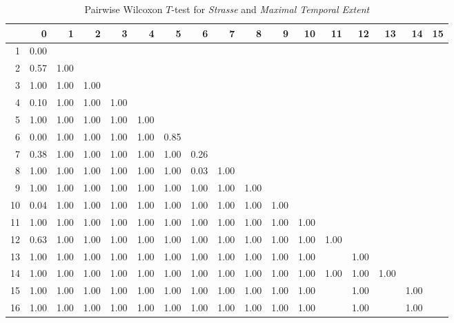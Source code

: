 \begin{table}[ht!]
	\tiny
	\setlength{\tabcolsep}{4pt}
	\centering
  \begin{tabular}{rrrrrrrrrrrrrrrrr}
    \hline
   & 0 & 1 & 2 & 3 & 4 & 5 & 6 & 7 & 8 & 9 & 10 & 11 & 12 & 13 & 14 & 15 \\ 
    \hline
  1 & 0.00 &  &  &  &  &  &  &  &  &  &  &  &  &  &  &  \\ 
    2 & 0.57 & 1.00 &  &  &  &  &  &  &  &  &  &  &  &  &  &  \\ 
    3 & 1.00 & 1.00 & 1.00 &  &  &  &  &  &  &  &  &  &  &  &  &  \\ 
    4 & 0.10 & 1.00 & 1.00 & 1.00 &  &  &  &  &  &  &  &  &  &  &  &  \\ 
    5 & 1.00 & 1.00 & 1.00 & 1.00 & 1.00 &  &  &  &  &  &  &  &  &  &  &  \\ 
    6 & 0.00 & 1.00 & 1.00 & 1.00 & 1.00 & 0.85 &  &  &  &  &  &  &  &  &  &  \\ 
    7 & 0.38 & 1.00 & 1.00 & 1.00 & 1.00 & 1.00 & 0.26 &  &  &  &  &  &  &  &  &  \\ 
    8 & 1.00 & 1.00 & 1.00 & 1.00 & 1.00 & 1.00 & 0.03 & 1.00 &  &  &  &  &  &  &  &  \\ 
    9 & 1.00 & 1.00 & 1.00 & 1.00 & 1.00 & 1.00 & 1.00 & 1.00 & 1.00 &  &  &  &  &  &  &  \\ 
    10 & 0.04 & 1.00 & 1.00 & 1.00 & 1.00 & 1.00 & 1.00 & 1.00 & 1.00 & 1.00 &  &  &  &  &  &  \\ 
    11 & 1.00 & 1.00 & 1.00 & 1.00 & 1.00 & 1.00 & 1.00 & 1.00 & 1.00 & 1.00 & 1.00 &  &  &  &  &  \\ 
    12 & 0.63 & 1.00 & 1.00 & 1.00 & 1.00 & 1.00 & 1.00 & 1.00 & 1.00 & 1.00 & 1.00 & 1.00 &  &  &  &  \\ 
    13 & 1.00 & 1.00 & 1.00 & 1.00 & 1.00 & 1.00 & 1.00 & 1.00 & 1.00 & 1.00 & 1.00 &  & 1.00 &  &  &  \\ 
    14 & 1.00 & 1.00 & 1.00 & 1.00 & 1.00 & 1.00 & 1.00 & 1.00 & 1.00 & 1.00 & 1.00 & 1.00 & 1.00 & 1.00 &  &  \\ 
    15 & 1.00 & 1.00 & 1.00 & 1.00 & 1.00 & 1.00 & 1.00 & 1.00 & 1.00 & 1.00 & 1.00 &  & 1.00 &  & 1.00 &  \\ 
    16 & 1.00 & 1.00 & 1.00 & 1.00 & 1.00 & 1.00 & 1.00 & 1.00 & 1.00 & 1.00 & 1.00 &  & 1.00 &  & 1.00 &  \\ 
     \hline
  \end{tabular}
	\caption{Pairwise Wilcoxon $T$-test for \textit{Strasse} and \textit{Maximal Temporal Extent}}
	\label{tbl:wilcoxon_baysis_matched_Strasse_TMax}
\end{table}
